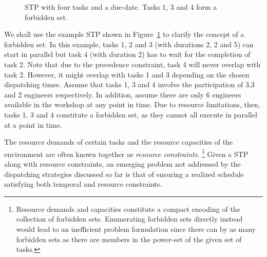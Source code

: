 	\begin{figure}
		\centering
		\caption{STP with four tasks and a due-date. Tasks 1, 3 and 4 form a forbidden set.}
		\label{chapter:prelim-1:example-4}
	\end{figure}

	\begin{example}
		We shall use the example STP shown in Figure~\ref{chapter:prelim-1:example-4} to clarify the concept of a forbidden set.
		In this example, tasks 1, 2 and 3 (with durations 2, 2 and 5) can start in parallel but task 4 (with duration 2) has to wait for the completion of task 2.
		Note that due to the precedence constraint, task 4 will never overlap with task 2.
		However, it might overlap with tasks 1 and 3 depending on the chosen dispatching times.
		Assume that tasks 1, 3 and 4 involve the participation of 3,3 and 2 engineers respectively.
		In addition, assume there are only 6 engineers available in the workshop at any point in time.
		Due to resource limitations, then, tasks 1, 3 and 4 constitute a forbidden set, as they cannot all execute in parallel at a point in time.
	\end{example}

	The resource demands of certain tasks and the resource capacities of the environment 
	are often known together as \emph{resource constraints}.%
	\footnote{Resource demands and capacities constitute a compact encoding of the collection of forbidden sets.
		Enumerating forbidden sets directly instead would lead to an inefficient problem formulation since there can by as many forbidden sets 
		as there are members in the power-set of the given set of tasks.}
	Given a STP along with resource constraints,
	an emerging problem not addressed by the dispatching strategies discussed so far
	is that of ensuring a realized schedule satisfying both temporal and resource constraints.

